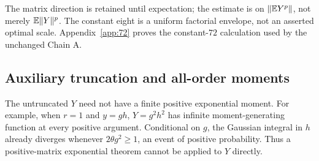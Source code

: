 \documentclass[11pt]{article}
\numberwithin{equation}{section}
\theoremstyle{definition}\newtheorem{definition}[theorem]{Definition}
\theoremstyle{remark}\newtheorem{remark}[theorem]{Remark}
\newcommand{\norm}[1]{\lVert#1\rVert}\newcommand{\ip}[2]{\langle#1,#2\rangle}
\begin{document}
The matrix direction is retained until expectation; the estimate is on
$\norm{\E Y^p}$, not merely $\E\norm Y^p$. The constant eight is a uniform
factorial envelope, not an asserted optimal scale. Appendix~\ref{app:72} proves the constant-$72$ calculation used by the
unchanged Chain A.

\subsection{Auxiliary truncation and all-order moments}
The untruncated $Y$ need not have a finite positive exponential moment. For example,
when $r=1$ and $y=gh$, $Y=g^2h^2$ has infinite moment-generating function at every
positive argument. Conditional on $g$, the Gaussian integral in $h$ already diverges
whenever $2\theta g^2\ge1$, an event of positive probability.
Thus a positive-matrix exponential theorem cannot be applied to $Y$ directly.
\end{document}
